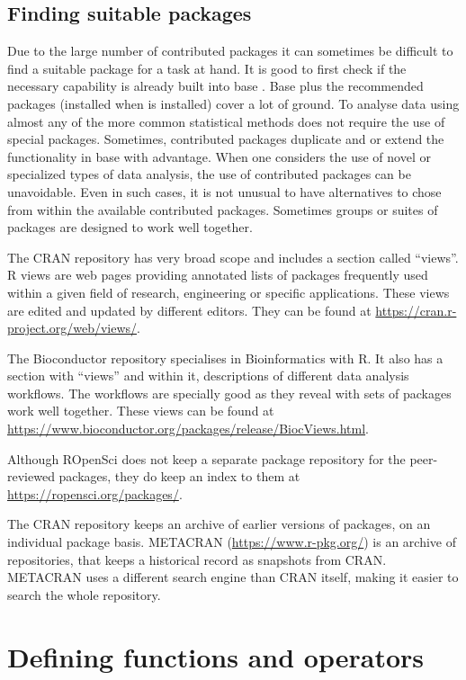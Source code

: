 \documentclass[krantz2]{krantz}\usepackage{knitr}%
\begin{document}
\subsection{Finding suitable packages}

Due to the large number of contributed \Rlang packages it can sometimes be difficult to find a suitable package for a task at hand. It is good to first check if the necessary capability is already built into base \Rlang. Base \Rlang plus the recommended packages (installed when \Rlang is installed) cover a lot of ground. To analyse data using almost any of the more common statistical methods does not require the use of special packages. Sometimes, contributed packages duplicate and or extend the functionality in base \Rlang with advantage. When one considers the use of novel or specialized types of data analysis, the use of contributed packages can be unavoidable. Even in such cases, it is not unusual to have alternatives to chose from within the available contributed packages. Sometimes groups or suites of packages are designed to work well together.

The CRAN repository has very broad scope and includes a section called ``views''. R views are web pages providing annotated lists of packages frequently used within a given field of research, engineering or specific applications. These views are edited and updated by different editors. They can be found at \url{https://cran.r-project.org/web/views/}.

The Bioconductor repository specialises in Bioinformatics with R. It also has a section with ``views'' and within it, descriptions of different data analysis workflows. The workflows are specially good as they reveal with sets of packages work well together. These views can be found at \url{https://www.bioconductor.org/packages/release/BiocViews.html}.

Although ROpenSci does not keep a separate package repository for the peer-reviewed packages, they do keep an index to them at \url{https://ropensci.org/packages/}. 

The CRAN repository keeps an archive of earlier versions of packages, on an individual package basis. METACRAN (\url{https://www.r-pkg.org/}) is an archive of repositories, that keeps a historical record as snapshots from CRAN. METACRAN uses a different search engine than CRAN itself, making it easier to search the whole repository.

\section{Defining functions and operators}\label{sec:script:functions}
\end{document}
